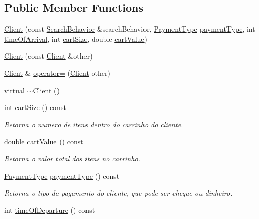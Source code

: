 \subsection*{Public Member Functions}
\begin{DoxyCompactItemize}
\item 
\hyperlink{classClient_a3b5a8f683ebd0abdf91b8cfe4c8be817}{Client} (const \hyperlink{classSearchBehavior}{Search\-Behavior} \&search\-Behavior, \hyperlink{PaymentType_8h_afd93b6d28fbdc89dd453db787f87ec6f}{Payment\-Type} \hyperlink{classClient_a9cceb950fc9c53ea35bcddf6214e4e4f}{payment\-Type}, int \hyperlink{classClient_af327f525b4cf7838d97c095c8dd00e60}{time\-Of\-Arrival}, int \hyperlink{classClient_a2ef5728c74cc7f9dfce8b5e9e950427c}{cart\-Size}, double \hyperlink{classClient_a52b9e8ce7f11c440fb532f6056db5fe2}{cart\-Value})
\item 
\hyperlink{classClient_a4d8e3b9fdfa24b7586bcf24537b89b67}{Client} (const \hyperlink{classClient}{Client} \&other)
\item 
\hyperlink{classClient}{Client} \& \hyperlink{classClient_acc35776f6a75d2fb8d4abfb3cc33f8a3}{operator=} (\hyperlink{classClient}{Client} other)
\item 
virtual \hyperlink{classClient_a840e519ca781888cbd54181572ebe3a7}{$\sim$\-Client} ()
\item 
int \hyperlink{classClient_a2ef5728c74cc7f9dfce8b5e9e950427c}{cart\-Size} () const 
\begin{DoxyCompactList}\small\item\em Retorna o numero de itens dentro do carrinho do cliente. \end{DoxyCompactList}\item 
double \hyperlink{classClient_a52b9e8ce7f11c440fb532f6056db5fe2}{cart\-Value} () const 
\begin{DoxyCompactList}\small\item\em Retorna o valor total dos itens no carrinho. \end{DoxyCompactList}\item 
\hyperlink{PaymentType_8h_afd93b6d28fbdc89dd453db787f87ec6f}{Payment\-Type} \hyperlink{classClient_a9cceb950fc9c53ea35bcddf6214e4e4f}{payment\-Type} () const 
\begin{DoxyCompactList}\small\item\em Retorna o tipo de pagamento do cliente, que pode ser cheque ou dinheiro. \end{DoxyCompactList}\item 
int \hyperlink{classClient_ae56c063a8bc1c57e9c47ad88b1770994}{time\-Of\-Departure} () const 

\end{DoxyCompactItemize}
